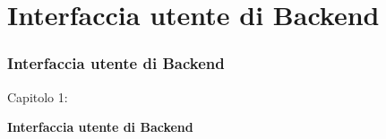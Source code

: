 %

\section{Interfaccia utente di Backend}
\begin{frame}[fragile]
	\frametitle{Interfaccia utente di Backend}

	\begin{center}\huge{Capitolo 1:}\end{center}
	\begin{center}\huge{\color{typo3darkgrey}\textbf{Interfaccia utente di Backend}}\end{center}

\end{frame}

